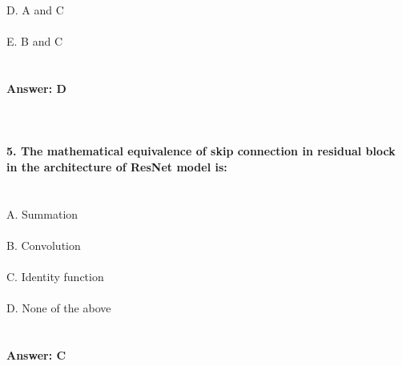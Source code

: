 \documentclass[prl,twocolumn,showpacs,preprintnumbers,superscriptaddress]{revtex4}
\theoremstyle{plain}
\theoremstyle{definition}
\begin{document}
\begin{widetext}
D. A and C
\\
\\
E. B and C
\\
\\
\\
\textbf{Answer: D}
\\
\\
\\
\\
\textbf{5. The mathematical equivalence of skip connection in residual block in the architecture of ResNet model is:}
\\
\\
\\
A. Summation
\\
\\
B. Convolution
\\
\\
C. Identity function
\\
\\
D. None of the above
\\
\\
\\
\textbf{Answer: C}
\\
\\
\\
\\
\\
\\
\end{widetext}
\end{document}

